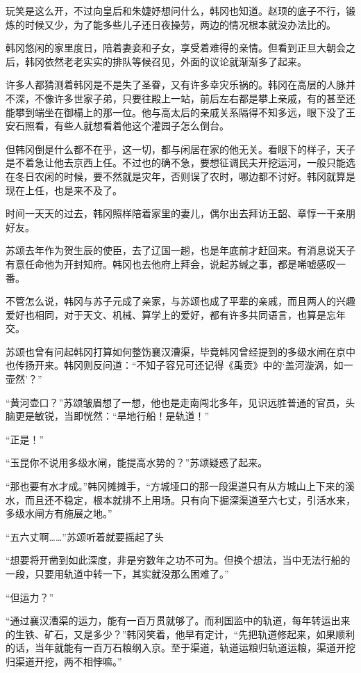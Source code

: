 玩笑是这么开，不过向皇后和朱婕妤想问什么，韩冈也知道。赵顼的底子不行，锻炼的时候又少，为了能多些儿子还日夜操劳，两边的情况根本就没办法比的。

韩冈悠闲的家里度日，陪着妻妾和子女，享受着难得的亲情。但看到正旦大朝会之后，韩冈依然老老实实的排队等候召见，外面的议论就渐渐多了起来。

许多人都猜测着韩冈是不是失了圣眷，又有许多幸灾乐祸的。韩冈在高层的人脉并不深，不像许多世家子弟，只要往殿上一站，前后左右都是攀上亲戚，有的甚至还能攀到端坐在御榻上的那一位。他与高太后的亲戚关系隔得不知多远，眼下没了王安石照看，有些人就想看着他这个灌园子怎么倒台。

但韩冈倒是什么都不在乎，这一切，都与闲居在家的他无关。看眼下的样子，天子是不着急让他去京西上任。不过也的确不急，要想征调民夫开挖运河，一般只能选在冬日农闲的时候，要不然就是灾年，否则误了农时，哪边都不讨好。韩冈就算是现在上任，也是来不及了。

时间一天天的过去，韩冈照样陪着家里的妻儿，偶尔出去拜访王韶、章惇一干亲朋好友。

苏颂去年作为贺生辰的使臣，去了辽国一趟，也是年底前才赶回来。有消息说天子有意任命他为开封知府。韩冈也去他府上拜会，说起苏缄之事，都是唏嘘感叹一番。

不管怎么说，韩冈与苏子元成了亲家，与苏颂也成了平辈的亲戚，而且两人的兴趣爱好也相同，对于天文、机械、算学上的爱好，都有许多共同语言，也算是忘年交。

苏颂也曾有问起韩冈打算如何整饬襄汉漕渠，毕竟韩冈曾经提到的多级水闸在京中也传扬开来。韩冈则反问道：“不知子容兄可还记得《禹贡》中的‘盖河漩涡，如一壶然’？”

“黄河壶口？”苏颂皱眉想了一想，他也是走南闯北多年，见识远胜普通的官员，头脑更是敏锐，当即恍然：“旱地行船！是轨道！”

“正是！”

“玉昆你不说用多级水闸，能提高水势的？”苏颂疑惑了起来。

“那也要有水才成。”韩冈摊摊手，“方城垭口的那一段渠道只有从方城山上下来的溪水，而且还不稳定，根本就排不上用场。只有向下掘深渠道至六七丈，引活水来，多级水闸方有施展之地。”

“五六丈啊……”苏颂听着就要摇起了头

“想要将开凿到如此深度，非是穷数年之功不可为。但换个想法，当中无法行船的一段，只要用轨道中转一下，其实就没那么困难了。”

“但运力？”

“通过襄汉漕渠的运力，能有一百万贯就够了。而利国监中的轨道，每年转运出来的生铁、矿石，又是多少？”韩冈笑着，他早有定计，“先把轨道修起来，如果顺利的话，当年就能有一百万石粮纲入京。至于渠道，轨道运粮归轨道运粮，渠道开挖归渠道开挖，两不相悖嘛。”

